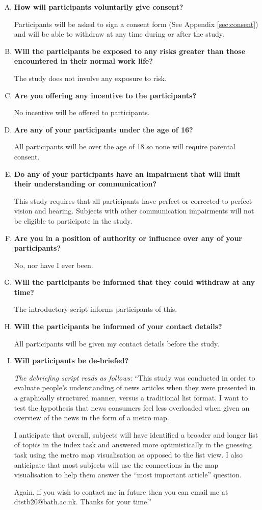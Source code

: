 \begin{enumerate}[Q.1]
	\item\textbf{How will participants voluntarily give consent?} \par
	Participants will be asked to sign a consent form (See Appendix \ref{sec:consent}) and will be able to withdraw at any time during or after the study. 
	\item\textbf{Will the participants be exposed to any risks greater than those encountered in their normal work life?} \par
	The study does not involve any exposure to risk.
	\item\textbf{Are you offering any incentive to the participants?} \par
	No incentive will be offered to participants.
	\item\textbf{Are any of your participants under the age of 16?} \par
	All participants will be over the age of 18 so none will require parental consent.
	\item\textbf{Do any of your participants have an impairment that will limit their understanding or communication?} \par
	This study requires that all participants have perfect or corrected to perfect vision and hearing. Subjects with other communication impairments will not be eligible to participate in the study.
	\item\textbf{Are you in a position of authority or influence over any of your participants?} \par
	No, nor have I ever been.
	\item\textbf{Will the participants be informed that they could withdraw at any time?} \par
	The introductory script informs participants of this.
	\item\textbf{Will the participants be informed of your contact details?} \par
	All participants will be given my contact details before the study.
	\item\textbf{Will participants be de-briefed?} \par
	\textit{The debriefing script reads as follows:}
	``This study was conducted in order to evaluate people's understanding of news articles when they were presented in a graphically structured manner, versus a traditional list format. I want to test the hypothesis that news consumers feel less overloaded when given an overview of the news in the form of a metro map. \par I anticipate that overall, subjects will have identified a broader and longer list of topics in the index task and answered more optimistically in the guessing task using the metro map visualisation as opposed to the list view. I also anticipate that most subjects will use the connections in the map visualisation to help them answer the ``most important article'' question. \par Again, if you wish to contact me in future then you can email me at dtstb20@bath.ac.uk. Thanks for your time.''

\end{enumerate}
